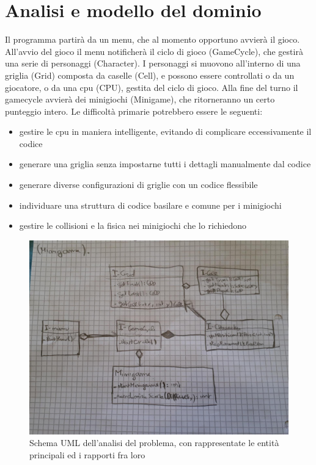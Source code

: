 \documentclass[a4paper,12pt]{report}
\begin{document}
\section{Analisi e modello del dominio}

Il programma partirà da un menu, che al momento opportuno avvierà il gioco.
%
All'avvio del gioco il menu notificherà il ciclo di gioco (GameCycle), che gestirà una serie di personaggi (Character).
%
I personaggi si muovono all'interno di una griglia (Grid) composta da caselle (Cell), e possono essere controllati o da un giocatore, o da una cpu (CPU), gestita del ciclo di gioco.
%
Alla fine del turno il gamecycle avvierà dei minigiochi (Minigame), che ritorneranno un certo punteggio intero.
%
Le difficoltà primarie potrebbero essere le seguenti:
\begin{itemize}
    \item gestire le cpu in maniera intelligente, evitando di complicare eccessivamente il codice
    \item generare una griglia senza impostarne tutti i dettagli manualmente dal codice
	\item generare diverse configurazioni di griglie con un codice flessibile
	\item individuare una struttura di codice basilare e comune per i minigiochi
    \item gestire le collisioni e la fisica nei minigiochi che lo richiedono
\end{itemize}

\begin{figure}[!t]
\centering{}
\includegraphics[width=150mm]{images/domain.jpeg}
\caption{Schema UML dell'analisi del problema, con rappresentate le entità principali ed i rapporti fra loro}
\label{img:analysis}
\end{figure}
\end{document}
